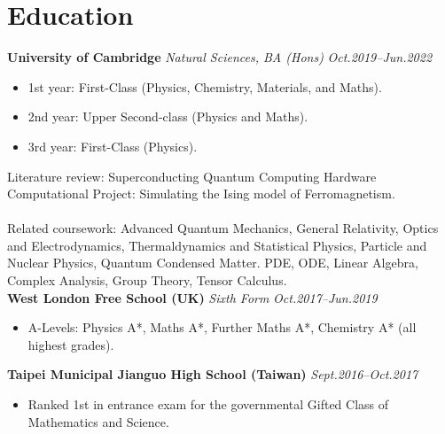 \documentclass[11pt,a4paper,roman]{moderncv}        %
\begin{document}
\makecvtitle

\section{Education}
\textbf{University of Cambridge} \textit{Natural Sciences, BA (Hons)} \hfill \textit{Oct.2019--Jun.2022}
\vspace*{1mm}

\begin{itemize}
    \item 1st year: First-Class (Physics, Chemistry, Materials, and Maths).
    \item 2nd year: Upper Second-class (Physics and Maths).
    \item 3rd year: First-Class (Physics).
\end{itemize}
\vspace*{3mm}
Literature review: Superconducting Quantum Computing Hardware\\
Computational Project: Simulating the Ising model of Ferromagnetism.\\
\\
Related coursework: Advanced Quantum Mechanics, General Relativity, Optics and Electrodynamics, Thermaldynamics and Statistical Physics,
Particle and Nuclear Physics, Quantum Condensed Matter. PDE, ODE, Linear Algebra, Complex Analysis, Group Theory, Tensor Calculus.\\


\textbf{West London Free School (UK)} \textit{Sixth Form} \hfill \textit{Oct.2017--Jun.2019}
\vspace*{1mm}
\begin{itemize}
\item{A-Levels: Physics A*, Maths A*, Further Maths A*, Chemistry A* (all highest grades).}
\end{itemize}
\vspace*{3mm}

\textbf{Taipei Municipal Jianguo High School (Taiwan)} \hfill \textit{Sept.2016--Oct.2017}
\vspace*{1mm}
\begin{itemize}
\item{Ranked 1st in entrance exam for the governmental Gifted Class of Mathematics and Science.}
\end{itemize}
\end{document}
